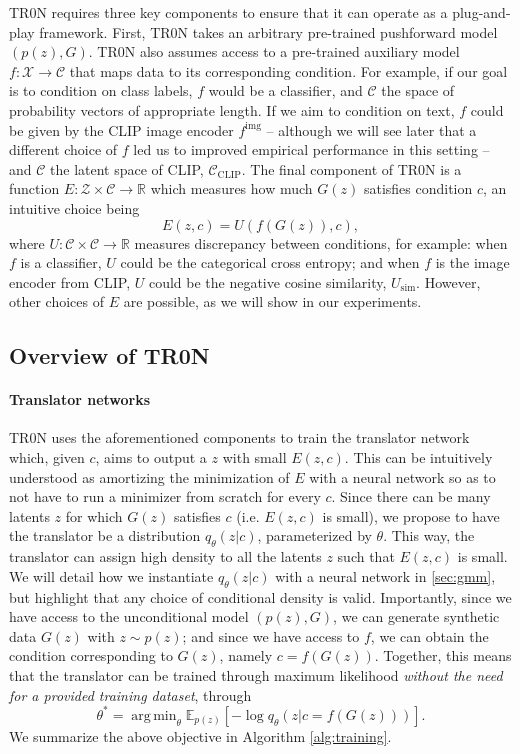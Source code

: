 \documentclass[nohyperref]{article}
\DeclareMathOperator*{\argmin}{arg\,min}
\theoremstyle{plain}
\theoremstyle{definition}
\theoremstyle{remark}
\begin{document}
TR0N requires three key components to ensure that it can operate as a plug-and-play framework. First, TR0N takes an arbitrary pre-trained pushforward model $(p(z), G)$. 
TR0N also assumes access to a pre-trained auxiliary model $f: \mathcal{X} \rightarrow \mathcal{C}$ that maps data to its corresponding condition. For example, if our goal is to condition on class labels, $f$ would be a classifier, and $\mathcal{C}$ the space of probability vectors of appropriate length. If we aim to condition on text, $f$ could be given by the CLIP image encoder $f^{\text{img}}$ -- although we will see later that a different choice of $f$ led us to improved empirical performance in this setting -- and $\mathcal{C}$ the latent space of CLIP, $\mathcal{C}_\text{CLIP}$.  
The final component of TR0N is a function $E: \mathcal{Z} \times \mathcal{C} \rightarrow \mathbb{R}$ which measures how much $G(z)$ satisfies condition $c$, an intuitive choice being 
\begin{equation}\label{eq:score}
    E(z,c) = U(f(G(z)), c),
\end{equation}
where $U: \mathcal{C} \times \mathcal{C} \rightarrow \mathbb{R}$ measures discrepancy between conditions, for example: when $f$ is a classifier, $U$ could be the categorical cross entropy; and when $f$ is the image encoder from CLIP, $U$ could be the negative cosine similarity, $U_{\text{sim}}$. However, other choices of $E$ are possible, as we will show in our experiments.

\subsection{Overview of TR0N}

\paragraph{Translator networks} TR0N uses the aforementioned components to train the translator network which, given $c$, aims to output a $z$ with small $E(z, c)$. This can be intuitively understood as amortizing the minimization of $E$ with a neural network so as to not have to run a minimizer from scratch for every $c$. Since there can be many latents $z$ for which $G(z)$ satisfies $c$ (i.e. $E(z, c)$ is small), we propose to have the translator be a distribution $q_\theta(z|c)$, parameterized by $\theta$. This way, the translator can assign high density to all the latents $z$ such that $E(z,c)$ is small. We will detail how we instantiate $q_\theta(z|c)$ with a neural network in \autoref{sec:gmm}, but highlight that any choice of conditional density is valid. Importantly, since we have access to the unconditional model $(p(z), G)$, we can generate synthetic data $G(z)$ with $z \sim p(z)$; and since we have access to $f$, we can obtain the condition corresponding to $G(z)$, namely $c=f(G(z))$. Together, this means that the translator can be trained through maximum likelihood \emph{without the need for a provided training dataset}, through
\begin{equation}\label{eq:ml}
\theta^* = \argmin_\theta \mathbb{E}_{p(z)}\left[-\log q_\theta \left(z|c=f(G(z))\right)\right].
\end{equation}
We summarize the above objective in Algorithm \ref{alg:training}.
\end{document}
